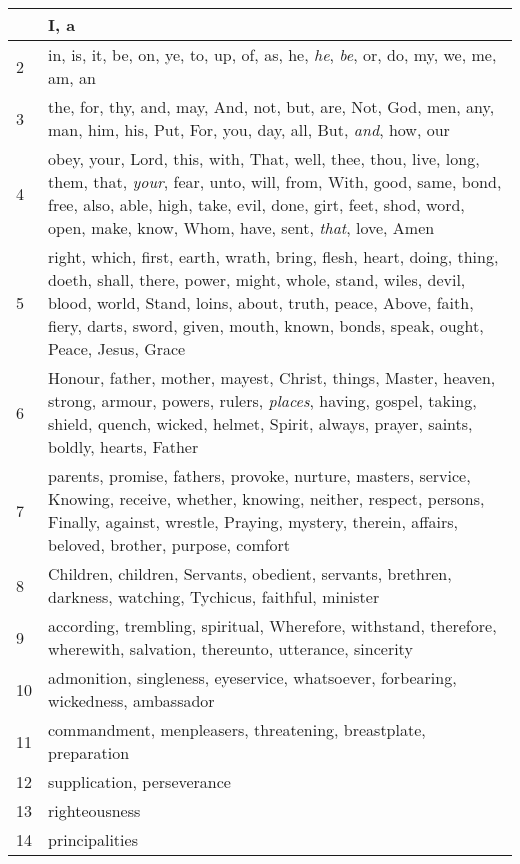 \begin{center}
\begin{longtable}{l|p{3.75in}}
\hline \hline 
\endlastfoot 
1 & I, a\\ \hline 
2 & in, is, it, be, on, ye, to, up, of, as, he, \emph{he}, \emph{be}, or, do, my, we, me, am, an\\ \hline 
3 & the, for, thy, and, may, And, not, but, are, Not, God, men, any, man, him, his, Put, For, you, day, all, But, \emph{and}, how, our\\ \hline 
4 & obey, your, Lord, this, with, That, well, thee, thou, live, long, them, that, \emph{your}, fear, unto, will, from, With, good, same, bond, free, also, able, high, take, evil, done, girt, feet, shod, word, open, make, know, Whom, have, sent, \emph{that}, love, Amen\\ \hline 
5 & right, which, first, earth, wrath, bring, flesh, heart, doing, thing, doeth, shall, there, power, might, whole, stand, wiles, devil, blood, world, Stand, loins, about, truth, peace, Above, faith, fiery, darts, sword, given, mouth, known, bonds, speak, ought, Peace, Jesus, Grace\\ \hline 
6 & Honour, father, mother, mayest, Christ, things, Master, heaven, strong, armour, powers, rulers, \emph{places}, having, gospel, taking, shield, quench, wicked, helmet, Spirit, always, prayer, saints, boldly, hearts, Father\\ \hline 
7 & parents, promise, fathers, provoke, nurture, masters, service, Knowing, receive, whether, knowing, neither, respect, persons, Finally, against, wrestle, Praying, mystery, therein, affairs, beloved, brother, purpose, comfort\\ \hline 
8 & Children, children, Servants, obedient, servants, brethren, darkness, watching, Tychicus, faithful, minister\\ \hline 
9 & according, trembling, spiritual, Wherefore, withstand, therefore, wherewith, salvation, thereunto, utterance, sincerity\\ \hline 
10 & admonition, singleness, eyeservice, whatsoever, forbearing, wickedness, ambassador\\ \hline 
11 & commandment, menpleasers, threatening, breastplate, preparation\\ \hline 
12 & supplication, perseverance\\ \hline 
13 & righteousness\\ \hline 
14 & principalities\\ \hline 
\end{longtable} 
\end{center} 




 
